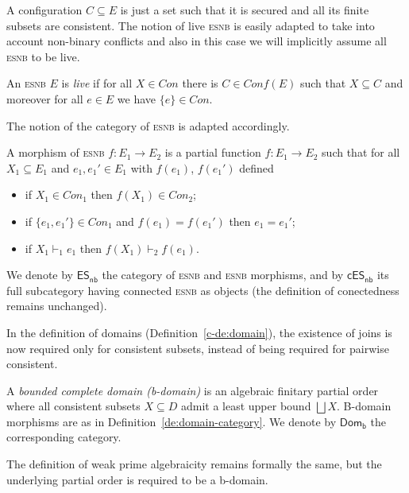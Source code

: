 \documentclass[conference]{IEEEtran}
\newcommand{\esnabbr}{\textsc{esnb}}
\newcommand{\esn}{\ensuremath{\mathsf{ES_{nb}}}}
\newcommand{\cesn}{\ensuremath{\mathsf{cES_{nb}}}}
\newcommand{\Domb}{\ensuremath{\mathsf{Dom_b}}}
\newcommand{\conf}[1]{\ensuremath{\mathit{Conf}({#1})}}
\begin{document}
A configuration $C \subseteq E$ is just a set such that
it is secured and all its finite subsets are consistent.
%
The notion of live {\esnabbr} is easily adapted to take into account
non-binary conflicts and also in this case we will implicitly assume
all {\esnabbr} to be live.

\begin{definition}[live {\esnabbr}]
  An {\esnabbr} ${E}$ is \emph{live} if for all
  $X \in Con$ there is $C \in \conf{E}$ such that
  $X \subseteq C$ and moreover
  for all $e \in E$ we have $\{ e \} \in  Con$.
\end{definition}


The notion of the category of {\esnabbr} is adapted accordingly.

\begin{definition}
  \label{a-de:es-morphism}
  A morphism of {\esnabbr} $f : {E}_1 \to {E}_2$ is a partial
  function $f : E_1 \to E_2$ such that
  for all $X_1 \subseteq E_1$ and $e_1, e_1' \in E_1$ with $f(e_1)$, $f(e_1')$ defined
  \begin{itemize}
  \item if $X_1 \in Con_1$ then $f(X_1) \in Con_2$;
  \item if $\{ e_1, e_1' \} \in Con_1$ and $f(e_1) = f(e_1')$ then $e_1 = e_1'$;
  \item if $X_1 \vdash_1 e_1$ then 
  $f(X_1) \vdash_2 f(e_1)$.
  \end{itemize}
  We denote by $\esn$ the category of {\esnabbr} and {\esnabbr} morphisms,
  and by $\cesn$ its full subcategory having connected {\esnabbr} as objects (the definition of conectedness remains unchanged).
\end{definition}

In the definition of domains (Definition~\ref{c-de:domain}), the
existence of joins is now required only for consistent subsets,
instead of being required for pairwise consistent.

\begin{definition}[b-domains]
  \label{de:domain}
  A \emph{bounded complete domain (b-domain)} is an algebraic
  finitary partial order where all consistent subsets $X \subseteq D$
  admit a least upper bound $\bigsqcup X$.
  B-domain morphisms are as in Definition~\ref{de:domain-category}. 
  We denote by $\Domb$ the corresponding category.
\end{definition}

%
The definition of weak prime algebraicity remains formally the same, 
but the underlying partial order is required to be a b-domain.
\end{document}
